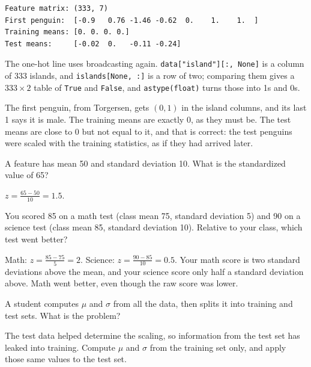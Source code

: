 \begin{verbatim}
Feature matrix: (333, 7)
First penguin:  [-0.9   0.76 -1.46 -0.62  0.    1.    1.  ]
Training means: [0. 0. 0. 0.]
Test means:     [-0.02  0.   -0.11 -0.24]
\end{verbatim}

The one-hot line uses broadcasting again. \verb|data["island"][:, None]| is a column of 333 islands, and
\verb|islands[None, :]| is a row of two; comparing them gives a $333 \times 2$ table of \verb|True| and
\verb|False|, and \verb|astype(float)| turns those into 1s and 0s.

The first penguin, from Torgersen, gets $(0, 1)$ in the island columns, and its last 1 says it is male. The
training means are exactly 0, as they must be. The test means are close to 0 but not equal to it, and that is
correct: the test penguins were scaled with the training statistics, as if they had arrived later.

\begin{Exercise}[label=std1, title=Standardize a value]
A feature has mean 50 and standard deviation 10. What is the standardized value of 65?
\end{Exercise}
\begin{Answer}[ref=std1]
$z = \frac{65 - 50}{10} = 1.5$.
\end{Answer}

\begin{Exercise}[label=std3, title=Which test went better?]
You scored 85 on a math test (class mean 75, standard deviation 5) and 90 on a science test (class mean 85,
standard deviation 10). Relative to your class, which test went better?
\end{Exercise}
\begin{Answer}[ref=std3]
Math: $z = \frac{85 - 75}{5} = 2$. Science: $z = \frac{90 - 85}{10} = 0.5$. Your math score is two standard
deviations above the mean, and your science score only half a standard deviation above. Math went better, even
though the raw score was lower.
\end{Answer}

\begin{Exercise}[label=std2, title=Leakage]
A student computes $\mu$ and $\sigma$ from all the data, then splits it into training and test sets. What is
the problem?
\end{Exercise}
\begin{Answer}[ref=std2]
The test data helped determine the scaling, so information from the test set has leaked into training. Compute
$\mu$ and $\sigma$ from the training set only, and apply those same values to the test set.
\end{Answer}

